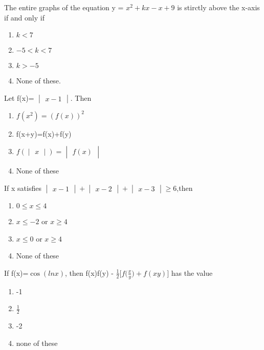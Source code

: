 \item The entire graphs of the equation y = $x^{2}+kx-x+9$ is stirctly above the x-axis if and only if
\begin{enumerate}
\item $k < 7$
\item $-5 < k < 7$
\item $k > -5$
\item None of these.
\end{enumerate}

\item Let f(x)= $\begin{vmatrix} x-1 \end{vmatrix}$. Then
\begin{enumerate}
\item $f(x^{2})=(f(x))^{2}$
\item f(x+y)=f(x)+f(y)
\item $f(\begin{vmatrix} x \end{vmatrix}) = \begin{vmatrix} f(x) \end{vmatrix}$
\item None of these
\end{enumerate}

\item If x satisfies $\begin{vmatrix} x-1 \end{vmatrix} + \begin{vmatrix} x-2 \end {vmatrix} + \begin{vmatrix} x-3 \end{vmatrix} \geq 6$,then
\begin{enumerate}
\item $0 \leq x \leq 4$
\item $x \leq -2$ or $x \geq 4$
\item $x \leq 0$ or $x \geq 4$
\item None of these
\end{enumerate}

\item If f(x)=$\cos(ln x)$, then f(x)f(y) - $\frac{1}{2}\Big[f\big(\frac{x}{y}\big)+f(xy)\Big]$  has the value
\begin{enumerate}
\item -1
\item $\frac{1}{2}$
\item -2
\item none of these
\end{enumerate}


